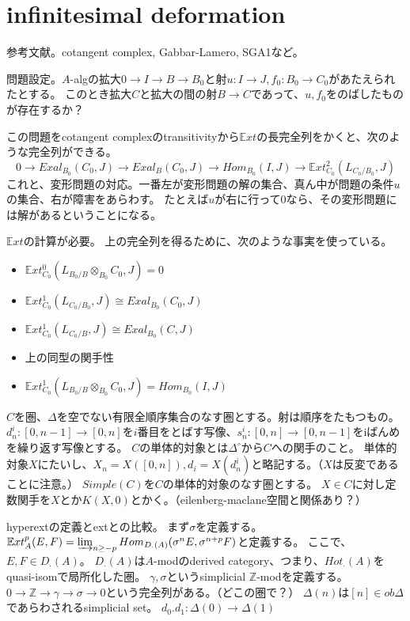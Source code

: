 \documentclass{jsarticle}
\begin{document}
\section{infinitesimal deformation}

参考文献。cotangent complex, Gabbar-Lamero, SGA1など。

問題設定。$A$-algの拡大$0\to I\to B \to B_0$と射$u:I \to J, f_0:B_0 \to C_0$があたえられたとする。
このとき拡大$C$と拡大の間の射$B \to C$であって、$u, f_0$をのばしたものが存在するか？


この問題をcotangent complexのtransitivityから$\mathbb{E}xt$の長完全列をかくと、次のような完全列ができる。
\[
0 \to Exal_{B_0}(C_0, J) \to Exal_{B}(C_0, J) \to Hom_{B_0}(I, J) \to \mathbb{E}xt^2_{C_0}(L_{C_0/B_0}, J)
\]
これと、変形問題の対応。一番左が変形問題の解の集合、真ん中が問題の条件$u$の集合、右が障害をあらわす。
たとえば$u$が右に行って$0$なら、その変形問題には解があるということになる。

$\mathbb{E}xt$の計算が必要。
上の完全列を得るために、次のような事実を使っている。

\begin{itemize}
\item $\mathbb{E}xt^0_{C_0}(L_{B_0/B}\otimes_{B_0} C_0, J) = 0$
\item $\mathbb{E}xt^1_{C_0}(L_{C_0/B_0}, J) \cong Exal_{B_0}(C_0, J)$
\item $\mathbb{E}xt^1_{C_0}(L_{C_0/B}, J) \cong Exal_{B_0}(C, J)$
\item 上の同型の関手性
\item $\mathbb{E}xt^1_{C_0}(L_{B_0/B}\otimes_{B_0} C_0, J) = Hom_{B_0}(I, J)$
\end{itemize}

$C$を圏、$\Delta$を空でない有限全順序集合のなす圏とする。射は順序をたもつもの。
$d^i_n: [0, n-1]\to[0,n]$を$i$番目をとばす写像、$s^i_n:[0,n]\to[0,n-1]$をiばんめを繰り返す写像とする。
$C$の単体的対象とは$\Delta^\circ$から$C$への関手のこと。
単体的対象$X$にたいし、$X_n=X([0,n]), d_i=X(d^i_n)$と略記する。（$X$は反変であることに注意。）
$Simple(C)$を$C$の単体的対象のなす圏とする。
$X\in C$に対し定数関手を$X$とか$K(X,0)$とかく。（eilenberg-maclane空間と関係あり？）

hyperextの定義とextとの比較。
まず$\sigma$を定義する。
$\mathbb{E}xt^p_A(E, F)= \varinjlim_{n\geq -p}Hom_{D_\cdot(A)}(\sigma^nE, \sigma^{n+p}F)$と定義する。
ここで、$E, F\in D_\cdot(A)$。
$D_\cdot(A)$は$A$-modのderived category、つまり、$Hot_\cdot(A)$をquasi-isomで局所化した圏。
$\gamma, \sigma$というsimplicial $\mathbb{Z}$-modを定義する。
$0 \to \mathbb{Z} \to \gamma \to \sigma \to 0$という完全列がある。（どこの圏で？）
$\Delta(n)$は$[n]\in ob \Delta$であらわされるsimplicial set。
$d_0. d_1: \Delta(0)\to\Delta(1)$
\end{document}
